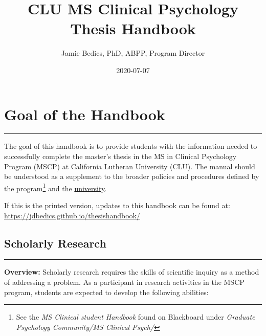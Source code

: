 \documentclass[
  openany]{book}
\title{CLU MS Clinical Psychology Thesis Handbook}
\author{Jamie Bedics, PhD, ABPP, Program Director}
\date{2020-07-07}
\begin{document}
\maketitle

{
\setcounter{tocdepth}{1}
\tableofcontents
}
\hypertarget{goal-of-the-handbook}{%
\chapter{Goal of the Handbook}\label{goal-of-the-handbook}}

\begin{center}\rule{0.5\linewidth}{0.5pt}\end{center}

The goal of this handbook is to provide students with the information needed to successfully complete the master's thesis in the MS in Clinical Psychology Program (MSCP) at California Lutheran University (CLU). The manual should be understood as a supplement to the broader policies and procedures defined by the program\footnote{See the \emph{MS Clinical student Handbook} found on Blackboard under \emph{Graduate Psychology Community/MS Clinical Psych/}} and the \href{https://www.callutheran.edu/students/student-conduct/student-handbook.html}{university}.

If this is the printed version, updates to this handbook can be found at: \url{https://jdbedics.github.io/thesishandbook/}

\hypertarget{scholarly-research}{%
\section{Scholarly Research}\label{scholarly-research}}

\begin{center}\rule{0.5\linewidth}{0.5pt}\end{center}

\textbf{Overview:} Scholarly research requires the skills of scientific inquiry as a method of addressing a problem. As a participant in research activities in the MSCP program, students are expected to develop the following abilities:
\end{document}

